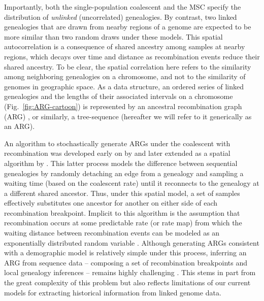 \documentclass[11pt]{article}
\begin{document}
Importantly, both the single-population coalescent and the MSC specify 
the distribution of \emph{unlinked} (uncorrelated) genealogies.
By contrast, two linked genealogies that are drawn from nearby regions of a genome %
are expected to be more similar than two random draws under these models. This spatial 
autocorrelation is a consequence of shared ancestry among samples at nearby regions, 
which decays over time and distance as recombination events reduce their shared ancestry.
To be clear, the spatial correlation here refers to the similarity 
among neighboring genealogies on a chromosome, and not to the similarity of genomes 
in geographic space.
As a data structure, an ordered series of linked genealogies and the lengths of 
their associated intervals on a chromosome (Fig.~\ref{fig:ARG-cartoon}) is represented 
by an ancestral recombination graph (ARG)
\citep{griffiths_ancestral_1996,lewanski_era_2024,y_c_brandt_evaluation_2022,nielsen_inference_2025,wong_general_2024},
or similarly, a tree-sequence 
\citep{kelleher2016efficient}
(hereafter we will refer to it generically as an ARG).

An algorithm to stochastically generate ARGs under the coalescent with 
recombination was developed early on by \citet{hudson1983properties} and 
later extended as a spatial algorithm by \citet{wiuf_recombination_1999}.
This latter process models the difference between sequential 
genealogies by randomly detaching an edge from a genealogy and sampling
a waiting time (based on the 
coalescent rate) until it reconnects to the genealogy at a different shared ancestor.
Thus, under this spatial model, a set of samples effectively substitutes
one ancestor for another on either side of each recombination breakpoint.
Implicit to this algorithm is the assumption that recombination 
occurs at some predictable rate (or rate map) from which the 
waiting distance between recombination events can be modeled as an 
exponentially distributed random variable \citep{wiuf_recombination_1999}.
Although generating ARGs consistent with a demographic model is 
relatively simple under this process, inferring an ARG from sequence data 
-- composing a set of recombination breakpoints and local genealogy inferences -- 
remains highly challenging \citep{y_c_brandt_evaluation_2022}.
This stems in part from the great complexity of this problem 
but also reflects limitations of our current models for 
extracting historical information from linked genome data.
\end{document}

